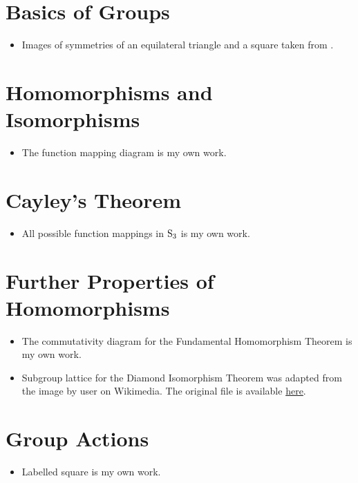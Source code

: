 \section{Basics of Groups}
\begin{itemize}
    \item Images of symmetries of an equilateral triangle and a square taken from \cite[p. 13]{milne_2021}.
\end{itemize}

\section{Homomorphisms and Isomorphisms}
\begin{itemize}
    \item The function mapping diagram is my own work.
\end{itemize}

\section{Cayley's Theorem}
\begin{itemize}
    \item All possible function mappings in $\mathrm{S}_{3}$ is my own work.
\end{itemize}

\section{Further Properties of Homomorphisms}
\begin{itemize}
    \item The commutativity diagram for the Fundamental Homomorphism Theorem is my own work.
    \item Subgroup lattice for the Diamond Isomorphism Theorem was adapted from the image by user  on Wikimedia. The original file is available \href{https://commons.wikimedia.org/wiki/File:Diagram_for_the_First_Isomorphism_Theorem.png}{here}.
\end{itemize}

\section{Group Actions}
\begin{itemize}
    \item Labelled square is my own work.
\end{itemize}

\printbibliography[heading=bibintoc, title={References and Bibliography}]


